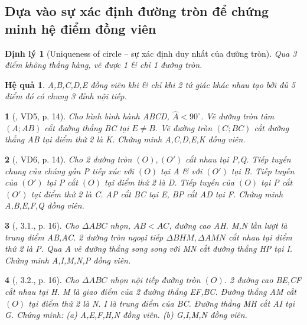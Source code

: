 \documentclass{article}
\newtheorem{baitoan}{}
\newtheorem{dinhly}{Định lý}
\newtheorem{hequa}{Hệ quả}
\begin{document}
\subsection{Dựa vào sự xác định đường tròn để chứng minh hệ điểm đồng viên}

\begin{dinhly}[Uniqueness of circle -- sự xác định duy nhất của đường tròn]
	Qua 3 điểm không thẳng hàng, vẽ được 1 \& chỉ 1 đường tròn.
\end{dinhly}

\begin{hequa}
	A,B,C,D,E đồng viên khi \& chỉ khi 2 tứ giác khác nhau tạo bởi đủ 5 điểm đó có chung 3 đỉnh nội tiếp.
\end{hequa}

\begin{baitoan}[\cite{Thu_Chung_Viet_Minh_circ}, VD5, p. 14]
	Cho hình bình hành ABCD, $\widehat{A} < 90^\circ$. Vẽ đường tròn tâm $(A;AB)$ cắt đường thẳng BC tại $E\ne B$. Vẽ đường tròn $(C;BC)$ cắt đường thẳng AB tại điểm thứ 2 là K. Chứng minh A,C,D,E,K đồng viên.
\end{baitoan}

\begin{baitoan}[\cite{Thu_Chung_Viet_Minh_circ}, VD6, p. 14]
	Cho 2 đường tròn $(O),(O')$ cắt nhau tại P,Q. Tiếp tuyến chung của chúng gần P tiếp xúc với $(O)$ tại A \& với $(O')$ tại B. Tiếp tuyến của $(O')$ tại P cắt $(O)$ tại điểm thứ 2 là D. Tiếp tuyến của $(O)$ tại P cắt $(O')$ tại điểm thứ 2 là C. AP cắt BC tại E, BP cắt AD tại F. Chứng minh A,B,E,F,Q đồng viên.
\end{baitoan}

\begin{baitoan}[\cite{Thu_Chung_Viet_Minh_circ}, 3.1., p. 16]
	Cho $\Delta ABC$ nhọn, $AB < AC$, đường cao AH. M,N lần lượt là trung điểm AB,AC. 2 đường tròn ngoại tiếp $\Delta BHM,\Delta AMN$ cắt nhau tại điểm thứ 2 là P. Qua A vẽ đường thẳng song song với MN cắt đường thẳng HP tại I. Chứng minh A,I,M,N,P đồng viên.
\end{baitoan}

\begin{baitoan}[\cite{Thu_Chung_Viet_Minh_circ}, 3.2., p. 16]
	Cho $\Delta ABC$ nhọn nội tiếp đường tròn $(O)$. 2 đường cao BE,CF cắt nhau tại H. M là giao điểm của 2 đường thẳng EF,BC. Đường thẳng AM cắt $(O)$ tại điểm thứ 2 là N. I là trung điểm của BC. Đường thẳng MH cắt AI tại G. Chứng minh: (a) A,E,F,H,N đồng viên. (b) G,I,M,N đồng viên.
\end{baitoan}
\end{document}
